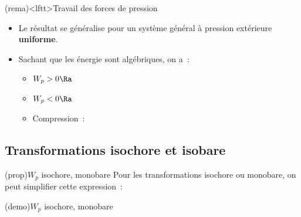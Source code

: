 \documentclass[../../main/main.tex]{subfiles}
\begin{document}
\begin{tcb}(rema)<lftt>{Travail des forces de pression}
	\begin{itemize}
		\item Le résultat se généralise pour un système général à pression extérieure
		      \textbf{uniforme}.
		\item Sachant que les énergie sont algébriques, on a~:
		      \begin{itemize}
			      \item $W_p > 0 \Ra$ 
			      \item $W_p < 0 \Ra$ %
			      \item Compression~: 
		      \end{itemize}
	\end{itemize}
\end{tcb}

\subsection{Transformations isochore et isobare}

\begin{tcb*}(prop){$W_p$ isochore, monobare}
	Pour les transformations isochore ou monobare, on peut simplifier cette
	expression~:
	\smallbreak
	\begin{isd}[sidebyside align=top]
		\psw{%
			\[
				\boxed{W_p = 0}
			\]
		}%
		\vspace{-15pt}
		\tcblower
		\psw{%
			\[
				\boxed{W_p = -P\ind{ext}\Delta{V}}
			\]
		}%
		\vspace{-15pt}
	\end{isd}
\end{tcb*}
\begin{tcb*}[sidebyside, sidebyside align=top, lefthand ratio=.3](demo){$W_p$ isochore, monobare}
	\vspace{-15pt}
	\vspace{-15pt}
	\tcblower
	\vspace{-15pt}
	\vspace{-15pt}
\end{tcb*}
\end{document}
